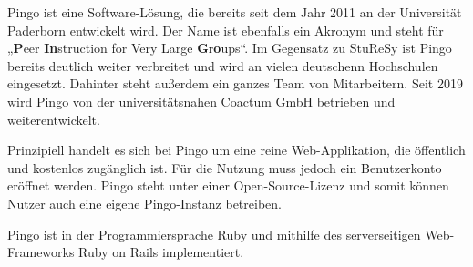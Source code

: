 Pingo ist eine Software-Lösung, die bereits seit dem Jahr 2011 an der Universität Paderborn entwickelt wird. Der Name ist ebenfalls ein Akronym und steht für „\textbf{P}eer \textbf{In}struction for Very Large \textbf{G}r\textbf{o}ups“. Im Gegensatz zu StuReSy ist Pingo bereits deutlich weiter verbreitet und wird an vielen deutschenn Hochschulen eingesetzt. Dahinter steht außerdem ein ganzes Team von Mitarbeitern. Seit 2019 wird Pingo von der universitätsnahen Coactum GmbH betrieben und weiterentwickelt.\newline

Prinzipiell handelt es sich bei Pingo um eine reine Web-Applikation, die öffentlich und kostenlos zugänglich ist. Für die Nutzung muss jedoch ein Benutzerkonto eröffnet werden. Pingo steht unter einer Open-Source-Lizenz und somit können Nutzer auch eine eigene Pingo-Instanz betreiben.

Pingo ist in der Programmiersprache Ruby und mithilfe des serverseitigen Web-Frameworks Ruby on Rails implementiert.